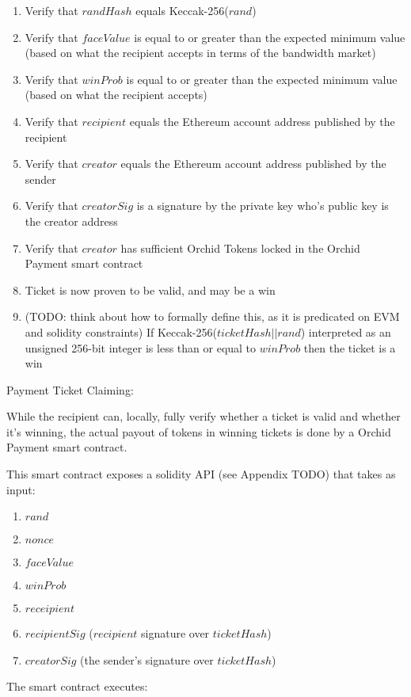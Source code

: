 \begin{enumerate}
\item Verify that $randHash$ equals Keccak-256($rand$)
\item Verify that $faceValue$ is equal to or greater than the expected minimum value (based on what the recipient accepts in terms of the bandwidth market)
\item Verify that $winProb$ is equal to or greater than the expected minimum value (based on what the recipient accepts)
\item Verify that $recipient$ equals the Ethereum account address published by the recipient
\item Verify that $creator$ equals the Ethereum account address published by the sender
\item Verify that $creatorSig$ is a signature by the private key who's public key is the creator address
\item Verify that $creator$ has sufficient Orchid Tokens locked in the Orchid Payment smart contract
\item Ticket is now proven to be valid, and may be a win
\item (TODO: think about how to formally define this, as it is predicated on EVM and solidity constraints) If Keccak-256($ticketHash || rand$) interpreted as an unsigned 256-bit integer is less than or equal to $winProb$ then the ticket is a win
\end{enumerate}

Payment Ticket Claiming:

While the recipient can, locally, fully verify whether a ticket is valid and whether it's winning, the actual payout of tokens in winning tickets is done by a Orchid Payment smart contract.

This smart contract exposes a solidity API (see Appendix TODO) that takes as input:
\begin{enumerate}
\item $rand$
\item $nonce$
\item $faceValue$
\item $winProb$
\item $receipient$
\item $recipientSig$ ($recipient$ signature over $ticketHash$)
\item $creatorSig$ (the sender's signature over $ticketHash$)
\end{enumerate}

The smart contract executes:

